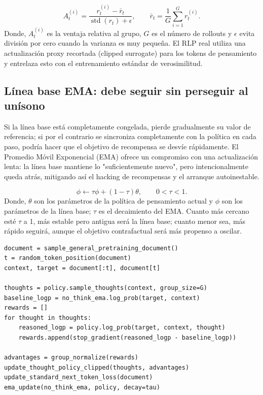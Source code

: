 
\[
A_t^{(i)}
=\frac{r_t^{(i)}-\bar r_t}{\operatorname{std}(r_t)+\epsilon},
\qquad
\bar r_t=\frac{1}{G}\sum_{i=1}^{G}r_t^{(i)}.
\]
Donde, $A_t^{(i)}$ es la ventaja relativa al grupo, $G$ es el número de rollouts y $\epsilon$ evita división por cero cuando la varianza es muy pequeña. El RLP real utiliza una actualización proxy recortada (clipped surrogate) para los tokens de pensamiento y entrelaza esto con el entrenamiento estándar de verosimilitud.

\subsection{Línea base EMA: debe seguir sin perseguir al unísono}

Si la línea base está completamente congelada, pierde gradualmente su valor de referencia; si por el contrario se sincroniza completamente con la política en cada paso, podría hacer que el objetivo de recompensa se desvíe rápidamente. El Promedio Móvil Exponencial (EMA) ofrece un compromiso con una actualización lenta: la línea base mantiene lo "suficientemente nuevo", pero intencionalmente queda atrás, mitigando así el hacking de recompensas y el arranque autoinestable.


\[
\phi\leftarrow \tau\phi+(1-\tau)\theta,
\qquad 0<\tau<1.
\]
Donde, $\theta$ son los parámetros de la política de pensamiento actual y $\phi$ son los parámetros de la línea base; $\tau$ es el decaimiento del EMA. Cuanto más cercano esté $\tau$ a 1, más estable pero antigua será la línea base; cuanto menor sea, más rápido seguirá, aunque el objetivo contrafactual será más propenso a oscilar.

\begin{lstlisting}[caption={Pseudocódigo simplificado para un paso de entrenamiento del RLP}]
document = sample_general_pretraining_document()
t = random_token_position(document)
context, target = document[:t], document[t]

thoughts = policy.sample_thoughts(context, group_size=G)
baseline_logp = no_think_ema.log_prob(target, context)
rewards = []
for thought in thoughts:
    reasoned_logp = policy.log_prob(target, context, thought)
    rewards.append(stop_gradient(reasoned_logp - baseline_logp))

advantages = group_normalize(rewards)
update_thought_policy_clipped(thoughts, advantages)
update_standard_next_token_loss(document)
ema_update(no_think_ema, policy, decay=tau)
\end{lstlisting}

